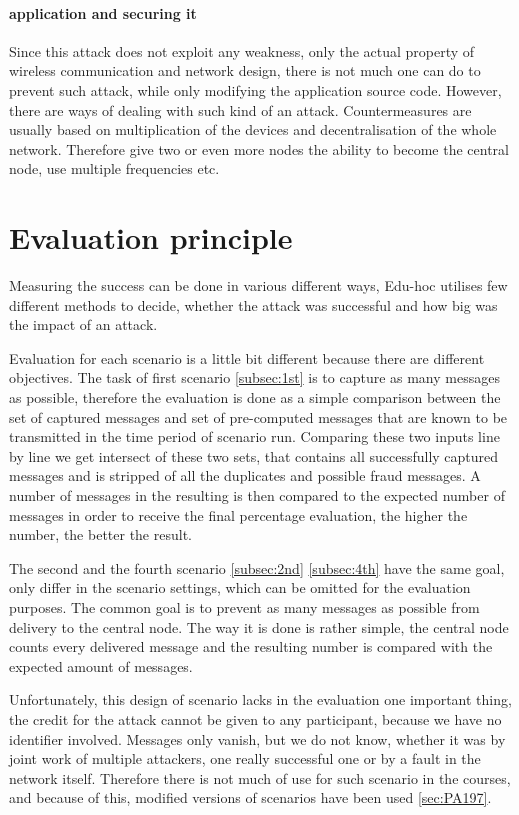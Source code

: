 \documentclass[
  print, %
  Table,   %
  nolof,     %
  nolot,     %
           oneside
]{fithesis3}
\begin{document}
    \paragraph{application and securing it}
    Since this attack does not exploit any weakness, only the actual property of wireless communication and network design, there is not much one can do to prevent such attack, while only modifying the application source code. However, there are ways of dealing with such kind of an attack. Countermeasures are usually based on multiplication of the devices and decentralisation of the whole network. Therefore give two or even more nodes the ability to become the central node, use multiple frequencies etc. %

  \section{Evaluation principle}\label{sec:eval}
  Measuring the success can be done in various different ways, Edu-hoc utilises few different methods to decide, whether the attack was successful and how big was the impact of an attack.

  Evaluation for each scenario is a little bit different because there are different objectives. The task of first scenario \ref{subsec:1st} is to capture as many messages as possible, therefore the evaluation is done as a simple comparison between the set of captured messages and set of pre-computed messages that are known to be transmitted in the time period of scenario run. Comparing these two inputs line by line we get intersect of these two sets, that contains all successfully captured messages and is stripped of all the duplicates and possible fraud messages. A number of messages in the resulting is then compared to the expected number of messages in order to receive the final percentage evaluation, the higher the number, the better the result.

  The second and the fourth scenario \ref{subsec:2nd} \ref{subsec:4th} have the same goal, only differ in the scenario settings, which can be omitted for the evaluation purposes. The common goal is to prevent as many messages as possible from delivery to the central node. The way it is done is rather simple, the central node counts every delivered message and the resulting number is compared with the expected amount of messages.

  Unfortunately, this design of scenario lacks in the evaluation one important thing, the credit for the attack cannot be given to any participant, because we have no identifier involved. Messages only vanish, but we do not know, whether it was by joint work of multiple attackers, one really successful one or by a fault in the network itself. Therefore there is not much of use for such scenario in the courses, and because of this, modified versions of scenarios have been used \ref{sec:PA197}.
\end{document}
